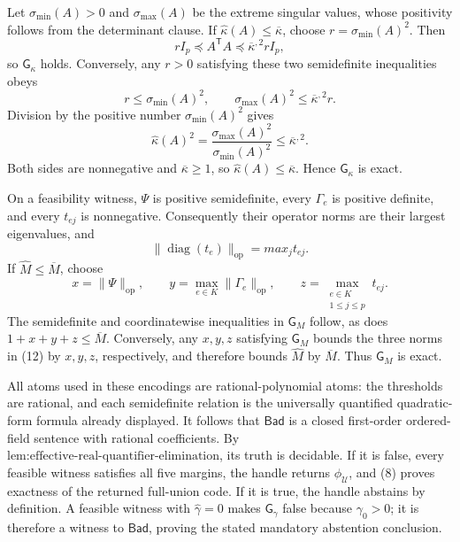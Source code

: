 Let \(\sigma_{\min}(A)>0\) and \(\sigma_{\max}(A)\) be the extreme singular values, whose positivity follows from the determinant clause.  If \(\widehat\kappa(A)\leq\overline\kappa\), choose \(r=\sigma_{\min}(A)^2\).  Then
\[
 rI_p\preceq A^{\mathsf T}A
 \preceq\overline\kappa^{,2}rI_p,
\]
so \(\mathsf G_\kappa\) holds.  Conversely, any \(r>0\) satisfying these two semidefinite inequalities obeys
\[
 r\leq\sigma_{\min}(A)^2,
 \qquad
 \sigma_{\max}(A)^2\leq\overline\kappa^{,2}r.
\]
Division by the positive number \(\sigma_{\min}(A)^2\) gives
\[
 \widehat\kappa(A)^2
 =\frac{\sigma_{\max}(A)^2}{\sigma_{\min}(A)^2}
 \leq\overline\kappa^{,2}.
\]
Both sides are nonnegative and \(\overline\kappa\geq1\), so \(\widehat\kappa(A)\leq\overline\kappa\).  Hence \(\mathsf G_\kappa\) is exact.

On a feasibility witness, \(\Psi\) is positive semidefinite, every \(\Gamma_e\) is positive definite, and every \(t_{ej}\) is nonnegative.  Consequently their operator norms are their largest eigenvalues, and
\[
 \|\operatorname{diag}(t_e)\|_{\mathrm{op}}=max_j t_{ej}.
\tag{12}
\]
If \(\widehat M\leq\overline M\), choose
\[
 x=\|\Psi\|_{\mathrm{op}},
 \qquad y=\max_{e\in K}\|\Gamma_e\|_{\mathrm{op}},
 \qquad z=\max_{\substack{e\in K\\1\leq j\leq p}}t_{ej}.
\]
The semidefinite and coordinatewise inequalities in \(\mathsf G_M\) follow, as does \(1+x+y+z\leq\overline M\).  Conversely, any \(x,y,z\) satisfying \(\mathsf G_M\) bounds the three norms in (12) by \(x,y,z\), respectively, and therefore bounds \(\widehat M\) by \(\overline M\).  Thus \(\mathsf G_M\) is exact.

All atoms used in these encodings are rational-polynomial atoms: the thresholds are rational, and each semidefinite relation is the universally quantified quadratic-form formula already displayed.  It follows that \(\mathsf{Bad}\) is a closed first-order ordered-field sentence with rational coefficients.  By \(\text{lem:effective-real-quantifier-elimination}\), its truth is decidable.  If it is false, every feasible witness satisfies all five margins, the handle returns \(\phi_{\mathcal U}\), and (8) proves exactness of the returned full-union code.  If it is true, the handle abstains by definition.  A feasible witness with \(\widehat\gamma=0\) makes \(\mathsf G_\gamma\) false because \(\gamma_0>0\); it is therefore a witness to \(\mathsf{Bad}\), proving the stated mandatory abstention conclusion.

